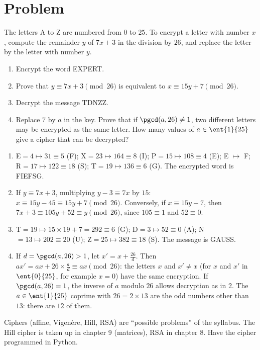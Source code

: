 \section{Problem}
\begin{problem}
The letters A to Z are numbered from $0$ to $25$. To encrypt a letter with number $x$, compute the remainder $y$ of $7x+3$ in the division by $26$, and replace the letter by the letter with number $y$.
\begin{enumerate}
\item Encrypt the word EXPERT.
\item Prove that $y\equiv7x+3\pmod{26}$ is equivalent to $x\equiv15y+7\pmod{26}$.
\item Decrypt the message TDNZZ.
\item Replace $7$ by $a$ in the key. Prove that if $\pgcd(a,26)\neq1$, two different letters may be encrypted as the same letter. How many values of $a\in\ent{1}{25}$ give a cipher that can be decrypted?
\end{enumerate}
\end{problem}
\begin{solution}[Problem]
\begin{enumerate}
\item E$=4\mapsto31\equiv5$ (F); X$=23\mapsto164\equiv8$ (I); P$=15\mapsto108\equiv4$ (E); E $\mapsto$ F; R$=17\mapsto122\equiv18$ (S); T$=19\mapsto136\equiv6$ (G). The encrypted word is FIEFSG.
\item If $y\equiv7x+3$, multiplying $y-3\equiv7x$ by $15$: $x\equiv15y-45\equiv15y+7\pmod{26}$. Conversely, if $x\equiv15y+7$, then $7x+3\equiv105y+52\equiv y\pmod{26}$, since $105\equiv1$ and $52\equiv0$.
\item T$=19\mapsto15\times19+7=292\equiv6$ (G); D$=3\mapsto52\equiv0$ (A); N$=13\mapsto202\equiv20$ (U); Z$=25\mapsto382\equiv18$ (S). The message is GAUSS.
\item If $d=\pgcd(a,26)>1$, let $x'=x+\frac{26}d$. Then $ax'=ax+26\times\frac ad\equiv ax\pmod{26}$: the letters $x$ and $x'\neq x$ (for $x$ and $x'$ in $\ent{0}{25}$, for example $x=0$) have the same encryption. If $\pgcd(a,26)=1$, the inverse of $a$ modulo $26$ allows decryption as in 2. The $a\in\ent{1}{25}$ coprime with $26=2\times13$ are the odd numbers other than $13$: there are $12$ of them.
\end{enumerate}
\end{solution}
\begin{teachernote}
Ciphers (affine, Vigenère, Hill, RSA) are ``possible problems'' of the syllabus. The Hill cipher is taken up in chapter 9 (matrices), RSA in chapter 8. Have the cipher programmed in Python.
\end{teachernote}
